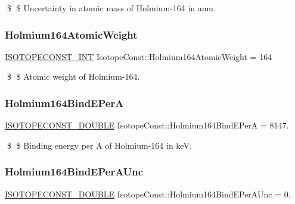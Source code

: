 \$ \$ Uncertainty in atomic mass of Holmium-\/164 in amu. \mbox{\label{group___isotope_const-_holmium-_ho164_ga60517fc3337a3829e7b0d7b77f7c1ac9}} 
\subsubsection{\texorpdfstring{Holmium164\+Atomic\+Weight}{Holmium164AtomicWeight}}
{\footnotesize\ttfamily \mbox{\hyperlink{group___isotope_const-_macros_ga5f18360b3e99483a35c32d789e62621c}{I\+S\+O\+T\+O\+P\+E\+C\+O\+N\+S\+T\+\_\+\+I\+NT}} Isotope\+Const\+::\+Holmium164\+Atomic\+Weight = 164}

\$ \$ Atomic weight of Holmium-\/164. \mbox{\label{group___isotope_const-_holmium-_ho164_ga2a37c1429bf37d0327635887849167cb}} 
\subsubsection{\texorpdfstring{Holmium164\+Bind\+E\+PerA}{Holmium164BindEPerA}}
{\footnotesize\ttfamily \mbox{\hyperlink{group___isotope_const-_macros_ga8f45a7272ce02c0b4c65c44636ed719a}{I\+S\+O\+T\+O\+P\+E\+C\+O\+N\+S\+T\+\_\+\+D\+O\+U\+B\+LE}} Isotope\+Const\+::\+Holmium164\+Bind\+E\+PerA = 8147.}

\$ \$ Binding energy per A of Holmium-\/164 in keV. \mbox{\label{group___isotope_const-_holmium-_ho164_ga0520a97c59a6c65d934d966e3880cf5d}} 
\subsubsection{\texorpdfstring{Holmium164\+Bind\+E\+Per\+A\+Unc}{Holmium164BindEPerAUnc}}
{\footnotesize\ttfamily \mbox{\hyperlink{group___isotope_const-_macros_ga8f45a7272ce02c0b4c65c44636ed719a}{I\+S\+O\+T\+O\+P\+E\+C\+O\+N\+S\+T\+\_\+\+D\+O\+U\+B\+LE}} Isotope\+Const\+::\+Holmium164\+Bind\+E\+Per\+A\+Unc = 0.}

